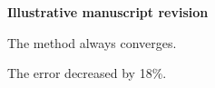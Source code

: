 \documentclass[12pt]{article}
\begin{document}
\noindent\textbf{Illustrative manuscript revision}

\noindent The method always converges.

\noindent The error decreased by 18\%.
\end{document}
